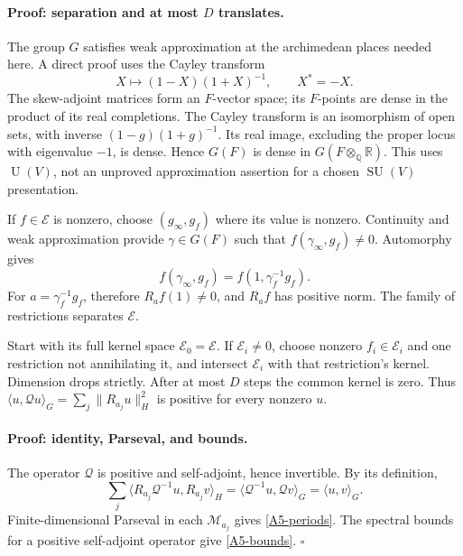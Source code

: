 \documentclass[11pt]{article}
\newcommand{\Q}{\mathbb Q}
\newcommand{\R}{\mathbb R}
\newcommand{\SU}{\operatorname{SU}}
\newcommand{\U}{\operatorname{U}}
\begin{document}
\paragraph{Proof: separation and at most $D$ translates.}
The group $G$ satisfies weak approximation at the archimedean places
needed here. A direct proof uses the Cayley transform
\[
 X\longmapsto(1-X)(1+X)^{-1},\qquad X^*=-X.
\]
The skew-adjoint matrices form an $F$-vector space; its $F$-points
are dense in the product of its real completions. The Cayley transform
is an isomorphism of open sets, with inverse
$(1-g)(1+g)^{-1}$. Its real image, excluding the proper locus with
eigenvalue $-1$, is dense. Hence $G(F)$ is dense in
$G(F\otimes_\Q\R)$. This uses $\U(V)$, not an unproved
approximation assertion for a chosen $\SU(V)$ presentation.

If $f\in\mathcal E$ is nonzero, choose $(g_\infty,g_f)$ where its
value is nonzero. Continuity and weak approximation provide
$\gamma\in G(F)$ such that $f(\gamma_\infty,g_f)\ne0$.
Automorphy gives
\[
 f(\gamma_\infty,g_f)=f(1,\gamma_f^{-1}g_f).
\]
For $a=\gamma_f^{-1}g_f$, therefore $R_af(1)\ne0$, and
$R_af$ has positive norm. The family of restrictions separates
$\mathcal E$.

Start with its full kernel space $\mathcal E_0=\mathcal E$.
If $\mathcal E_i\ne0$, choose nonzero $f_i\in\mathcal E_i$ and
one restriction not annihilating it, and intersect $\mathcal E_i$
with that restriction's kernel. Dimension drops strictly. After at
most $D$ steps the common kernel is zero. Thus
$\langle u,\mathcal Q u\rangle_G=\sum_j\|R_{a_j}u\|_H^2$
is positive for every nonzero $u$.

\paragraph{Proof: identity, Parseval, and bounds.}
The operator $\mathcal Q$ is positive and self-adjoint, hence
invertible. By its definition,
\[
 \sum_j\langle R_{a_j}\mathcal Q^{-1}u,R_{a_j}v\rangle_H
 =\langle\mathcal Q^{-1}u,\mathcal Q v\rangle_G
 =\langle u,v\rangle_G.
\]
Finite-dimensional Parseval in each $\mathcal M_{a_j}$ gives
\eqref{A5-periods}. The spectral bounds for a positive self-adjoint
operator give \eqref{A5-bounds}. $\square$
\end{document}

